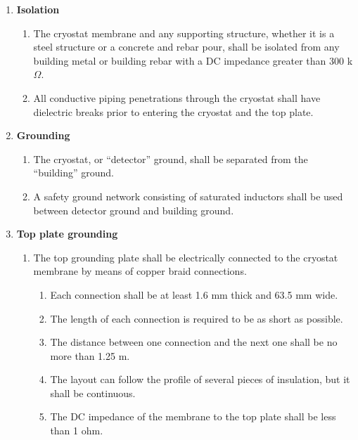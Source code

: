 \begin{enumerate}
\item \textbf{Isolation}
	\begin{enumerate}
	\item The cryostat membrane and any supporting structure, whether it is a steel structure or a concrete and rebar pour, shall be isolated from any building metal or building rebar with a DC impedance greater than 300 k$\Omega$.
	\item All conductive piping penetrations through the cryostat shall have dielectric breaks prior to entering the cryostat and the top plate.
	\end{enumerate}

\item \textbf{Grounding}
	\begin{enumerate}
	\item The cryostat, or ``detector'' ground, shall be separated from the ``building'' ground.
	\item A safety ground network consisting of saturated inductors shall be used between detector ground and building ground.
	\end{enumerate}

\item \textbf{Top plate grounding}
	\begin{enumerate}
	\item The top grounding plate shall be electrically connected to the cryostat membrane by means of copper braid connections.
	   \begin{enumerate}
	   \item Each connection shall be at least 1.6 mm thick and 63.5 mm wide.
	   \item The length of each connection is required to be as short as possible.
	   \item The distance between one connection and the next one shall be no more than 1.25 m.
	   \item The layout can follow the profile of several pieces of insulation, but it shall be continuous.	
	   \item The DC impedance of the membrane to the top plate shall be less than 1 ohm.
	   \end{enumerate}
	\end{enumerate}
\end{enumerate}


